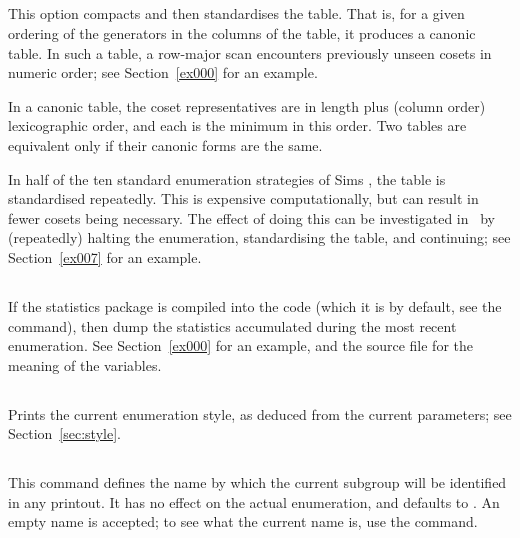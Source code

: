 \subsection{}

This option compacts and then standardises the table.
That is, for a given ordering of the generators in the columns of the
  table, it produces a canonic table.
In such a table, a row-major scan encounters previously unseen cosets in
  numeric order; see Section~\ref{ex000} for an example.

In a canonic table, the coset representatives are in length plus (column
  order) lexicographic order, and each is the minimum in this order.
Two tables are equivalent only if their canonic forms are the same.

In half of the ten standard enumeration strategies of Sims \cite{Sim94}, the
  table is standardised repeatedly.
This is expensive computationally, but can result in fewer cosets being
  necessary.
The effect of doing this can be investigated in \ace\ by (repeatedly)
  halting the enumeration, standardising the table, and continuing; see 
  Section~\ref{ex007} for an example.

\subsection{}

If the statistics package is compiled into the code (which it is by
  default, see the  command), then dump the statistics
  accumulated during the most recent enumeration.
See Section~\ref{ex000} for an example, and the  source file
  for the meaning of the variables.

\subsection{}

Prints the current enumeration style, as deduced from the current 
  \amp {} parameters; see Section~\ref{sec:style}.

\subsection{}

This command defines the name by which the current subgroup will be
  identified in any printout.
It has no effect on the actual enumeration, and defaults to .
An empty name is accepted; to see what the current name is, use the
   command.

